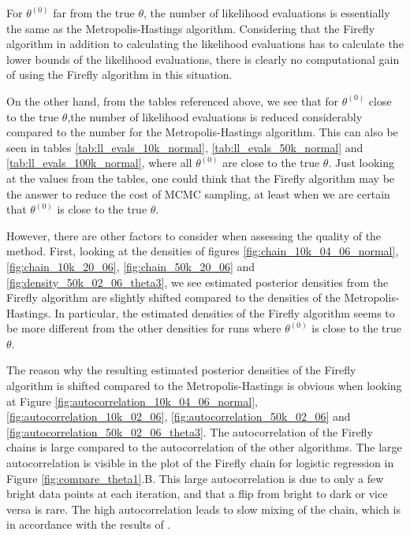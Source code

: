  
For $\theta^{\left(0\right)}$ far from the true $\theta$, the number of likelihood evaluations is essentially the same as the Metropolis-Hastings algorithm.
Considering that the Firefly algorithm in addition to calculating the likelihood evaluations has to calculate the lower bounds of the likelihood evaluations, there is clearly no computational gain of using the Firefly algorithm in this situation.

On the other hand, from the tables referenced above, we see that for $\theta^{\left(0\right)}$ close to the true $\theta$,the number of likelihood evaluations is reduced considerably compared to the number for the Metropolis-Hastings algorithm. 
This can also be seen in tables \ref{tab:ll_evals_10k_normal}, \ref{tab:ll_evals_50k_normal} and \ref{tab:ll_evals_100k_normal}, where all $\theta^{\left(0\right)}$ are close to the true $\theta$. Just looking at the values from the tables, one could think that the Firefly algorithm may be the answer to reduce the cost of MCMC sampling, at least when we are certain that $\theta^{\left(0\right)}$ is close to the true $\theta$. 

However, there are other factors to consider when assessing the quality of the method. First, looking at the densities of figures \ref{fig:chain_10k_04_06_normal}, \ref{fig:chain_10k_20_06}, \ref{fig:chain_50k_20_06} and \ref{fig:density_50k_02_06_theta3}, we see estimated posterior densities from the Firefly algorithm are slightly shifted compared to the densities of the Metropolis-Hastings.
In particular, the estimated densities of the Firefly algorithm seems to be more different from the other densities for runs where $\theta^{\left(0\right)}$ is close to the true $\theta$. 

The reason why the resulting estimated posterior densities of the Firefly algorithm is shifted compared to the Metropolis-Hastings is obvious when looking at Figure
\ref{fig:autocorrelation_10k_04_06_normal}, \ref{fig:autocorrelation_10k_02_06}, \ref{fig:autocorrelation_50k_02_06} and  \ref{fig:autocorrelation_50k_02_06_theta3}. The autocorrelation of the Firefly chains is large compared to the autocorrelation of the other algorithms. The large autocorrelation is visible in the plot of the Firefly chain for logistic regression in Figure \ref{fig:compare_theta1}.B. This large autocorrelation is due to only a few bright data points at each iteration, and that a flip from bright to dark or vice versa is rare. The high autocorrelation leads to slow mixing of the chain, which is in accordance with the results of \cite{Bardenet:1}.  

